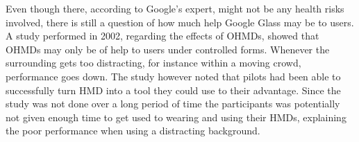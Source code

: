 %
%
Even though there, according to Google's expert, might not be any health risks involved, there is still a question of how much help Google Glass may be to users. A study performed in 2002\cite{laramee02}, regarding the effects of OHMDs, showed that OHMDs may only be of help to users under controlled forms. Whenever the surrounding gets too distracting, for instance within a moving crowd, performance goes down. The study however noted that pilots had been able to successfully turn HMD into a tool they could use to their advantage. Since the study was not done over a long period of time the participants was potentially not given enough time to get used to wearing and using their HMDs, explaining the poor performance when using a distracting background.

